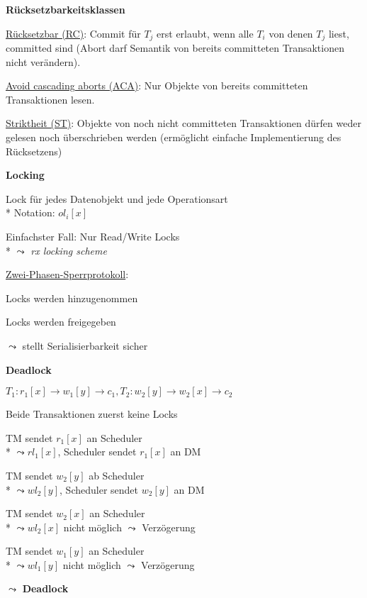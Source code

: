 \textbf{Rücksetzbarkeitsklassen}
\begin{items}
	\item \underline{Rücksetzbar (RC)}: Commit für $T_j$ erst erlaubt, wenn alle $T_i$ von denen $T_j$ liest, committed sind (Abort darf Semantik von bereits committeten Transaktionen nicht verändern).
	\item \underline{Avoid cascading aborts (ACA)}: Nur Objekte von bereits committeten Transaktionen lesen.
	\item \underline{Striktheit (ST)}: Objekte von noch nicht committeten Transaktionen dürfen weder gelesen noch überschrieben werden (ermöglicht einfache Implementierung des Rücksetzens)
\end{items}

\textbf{Locking}
\begin{items}
	\item Lock für jedes Datenobjekt und jede Operationsart
		\\*
		Notation: \( ol_i[x] \)
	\item Einfachster Fall: Nur Read/Write Locks
		\\*
		\( \leadsto \) \emph{rx locking scheme}
	\item \underline{Zwei-Phasen-Sperrprotokoll}:
	\begin{enumeration}
		\item Locks werden hinzugenommen
		\item Locks werden freigegeben
	\end{enumeration}
	\( \leadsto \) stellt Serialisierbarkeit sicher
\end{items}

\textbf{Deadlock}
\begin{items}
	\item \( T_1: r_1[x] \to w_1[y] \to c_1, T_2: w_2[y] \to w_2[x] \to c_2 \)
	\begin{enumeration}
		\item Beide Transaktionen zuerst keine Locks
		\item TM sendet \( r_1[x] \) an Scheduler
			\\*
			\( \leadsto rl_1[x] \), Scheduler sendet \( r_1[x] \) an DM
		\item TM sendet \( w_2[y] \) ab Scheduler
			\\*
			\( \leadsto wl_2[y] \), Scheduler sendet \( w_2[y] \) an DM
		\item TM sendet \( w_2[x] \) an Scheduler
			\\*
			\( \leadsto wl_2[x] \) nicht möglich \( \leadsto \) Verzögerung
		\item TM sendet \( w_1[y] \) an Scheduler
			\\*
			\( \leadsto wl_1[y] \) nicht möglich \( \leadsto \) Verzögerung
	\end{enumeration}
	\( \leadsto \) \textbf{Deadlock}
\end{items}

